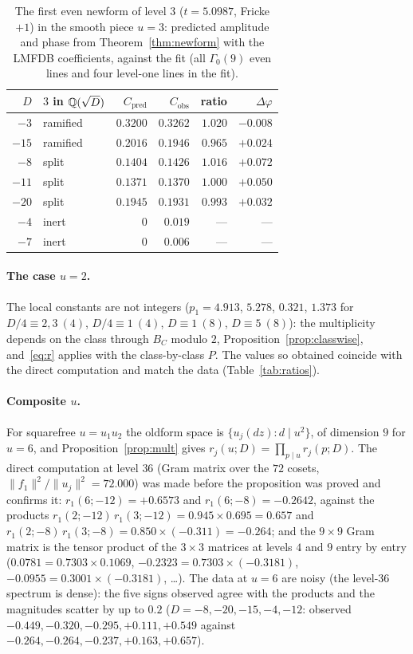 \documentclass[11pt,a4paper]{article}
\theoremstyle{remark}\newtheorem{remark}[theorem]{Remark}
\begin{document}
\begin{table}[htbp]\centering\small
\caption{The first even newform of level $3$ ($t=5.0987$, Fricke $+1$) in the smooth piece $u=3$: predicted amplitude and
phase from Theorem~\ref{thm:newform} with the LMFDB coefficients, against the fit (all $\Gamma_0(9)$ even lines and four
level-one lines in the fit).}\label{tab:newform}
\begin{tabular}{@{}rlrrrr@{}}
\toprule
$D$ & $3$ in $\mathbb Q(\sqrt D)$ & $C_{\mathrm{pred}}$ & $C_{\mathrm{obs}}$ & ratio & $\Delta\varphi$\\
\midrule
$-3$ & ramified & $0.3200$ & $0.3262$ & $1.020$ & $-0.008$\\
$-15$ & ramified & $0.2016$ & $0.1946$ & $0.965$ & $+0.024$\\
$-8$ & split & $0.1404$ & $0.1426$ & $1.016$ & $+0.072$\\
$-11$ & split & $0.1371$ & $0.1370$ & $1.000$ & $+0.050$\\
$-20$ & split & $0.1945$ & $0.1931$ & $0.993$ & $+0.032$\\
$-4$ & inert & $0$ & $0.019$ & --- & ---\\
$-7$ & inert & $0$ & $0.006$ & --- & ---\\
\bottomrule
\end{tabular}
\end{table}

\paragraph{The case $u=2$.} The local constants are not integers ($p_1=4.913$, $5.278$, $0.321$, $1.373$ for
$D/4\equiv2,3\ (4)$, $D/4\equiv1\ (4)$, $D\equiv1\ (8)$, $D\equiv5\ (8)$): the multiplicity depends on the class through
$B_C$ modulo $2$, Proposition~\ref{prop:classwise}, and~\eqref{eq:r} applies with the class-by-class $P$. The values so obtained
coincide with the direct computation and match the data (Table~\ref{tab:ratios}).

\paragraph{Composite $u$.} For squarefree $u=u_1u_2$ the oldform space is $\{u_j(dz):d\mid u^2\}$, of dimension $9$ for $u=6$,
and Proposition~\ref{prop:mult} gives $r_j(u;D)=\prod_{p\mid u}r_j(p;D)$. The direct computation at level $36$ (Gram matrix over the
$72$ cosets, $\|f_1\|^2/\|u_j\|^2=72.000$) was made before the proposition was proved and confirms it: $r_1(6;-12)=+0.6573$ and
$r_1(6;-8)=-0.2642$, against the products $r_1(2;-12)\,r_1(3;-12)=0.945\times0.695=0.657$ and
$r_1(2;-8)\,r_1(3;-8)=0.850\times(-0.311)=-0.264$; and the $9\times9$ Gram matrix is the tensor product of the $3\times3$
matrices at levels $4$ and $9$ entry by entry ($0.0781=0.7303\times0.1069$, $-0.2323=0.7303\times(-0.3181)$,
$-0.0955=0.3001\times(-0.3181)$, \dots). The data at $u=6$ are noisy (the level-$36$ spectrum is dense): the five signs observed
agree with the products and the magnitudes scatter by up to $0.2$ ($D=-8,-20,-15,-4,-12$: observed
$-0.449,-0.320,-0.295,+0.111,+0.549$ against $-0.264,-0.264,-0.237,+0.163,+0.657$).
\end{document}
